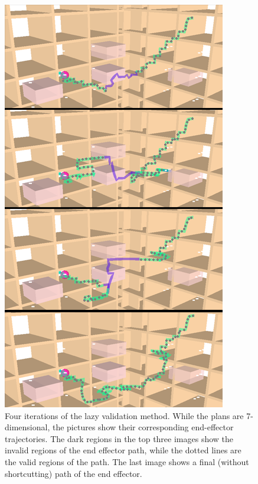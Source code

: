 \documentclass[letterpaper, 10 pt, conference]{ieeeconf}  %
\newcommand{\figlab}[1]{\label{fig:#1}}
\begin{document}
\begin{figure}[H]
    \includegraphics[width=1\columnwidth]{four_itrs.png} \caption{Four
        iterations of the lazy validation method. While the plans are
        7-dimensional, the pictures show their corresponding end-effector
        trajectories. The dark regions in the top three images show the invalid
        regions of the end effector path, while the dotted lines are the valid
    regions of the path. The last image shows a final (without shortcutting) path of
the end effector.  }
    \figlab{itrs}
\end{figure}
\end{document}
